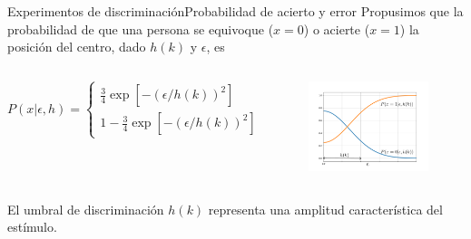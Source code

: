 \documentclass[
    11pt, %
    aspectratio=169, %
]{beamer}
\begin{document}
\begin{frame}{Experimentos de discriminación}{Probabilidad de acierto y error}
    Propusimos que la probabilidad de que una persona se equivoque ($x=0$) o acierte ($x=1$) la posición del centro, dado $h(k)$ y $\epsilon$, es

\begin{columns}[c]

\begin{column}{0.5\textwidth}
    

    
    \begin{equation*}\label{eqn:cap2_prob}
P(x|\epsilon,h)=
    \begin{cases}
        \displaystyle\frac{3}{4}\exp\left[-(\epsilon/h(k))^2\right] & \text{si } x = 0\\
        1 - \displaystyle\frac{3}{4}\exp\left[-(\epsilon/h(k))^2\right] & \text{si } x = 1.
    \end{cases}
\end{equation*}

\end{column}

\begin{column}{0.5\textwidth}
    \begin{figure}
        \centering
        \includegraphics[width = 5cm]{Images/experimental/p_de_x_cuad.pdf}
    \end{figure}
    
\end{column}


\end{columns}

El umbral de discriminación $h(k)$ representa una amplitud característica del estímulo.


\end{frame}
\end{document}
